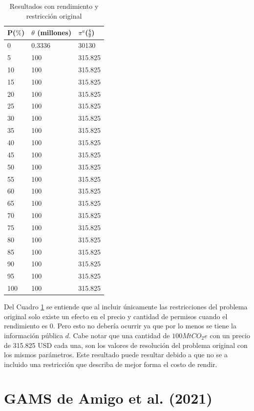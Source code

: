 \begin{table}[H]
\centering
\begin{tabular}{|l|l|l|}
\hline
\textbf{P($\%$)} & \textbf{$\theta$ (millones)} & \textbf{$\pi^a$($\frac{\$}{\theta}$)} \\ \hline
0 & 0.3336 & 30130 \\ \hline
5 & 100 & 315.825 \\ \hline
10 & 100 & 315.825 \\ \hline
15 & 100 & 315.825 \\ \hline
20 & 100 & 315.825 \\ \hline
25 & 100 & 315.825 \\ \hline
30 & 100 & 315.825 \\ \hline
35 & 100 & 315.825 \\ \hline
40 & 100 & 315.825 \\ \hline
45 & 100 & 315.825 \\ \hline
50 & 100 & 315.825 \\ \hline
55 & 100 & 315.825 \\ \hline
60 & 100 & 315.825 \\ \hline
65 & 100 & 315.825 \\ \hline
70 & 100 & 315.825 \\ \hline
75 & 100 & 315.825 \\ \hline
80 & 100 & 315.825 \\ \hline
85 & 100 & 315.825 \\ \hline
90 & 100 & 315.825 \\ \hline
95 & 100 & 315.825 \\ \hline
100 & 100 & 315.825 \\ \hline
\end{tabular}
\caption{Resultados con rendimiento y restricción original}
\label{tabla:conrestr}
\end{table}

Del Cuadro \ref{tabla:conrestr} se entiende que al incluir únicamente las restricciones del problema original solo existe un efecto en el precio y cantidad de permisos cuando el rendimiento es 0. Pero esto no debería ocurrir ya que por lo menos se tiene la información pública $d$. Cabe notar que una cantidad de $100 MtCO_2 e$ con un precio de 315.825 USD cada una, son los valores de resolución del problema original con los mismos parámetros. Este resultado puede resultar debido a que no se a incluido una restricción que describa de mejor forma el costo de rendir.

\section{GAMS de Amigo et al. (2021)}\label{anexo:GAMScomp}
